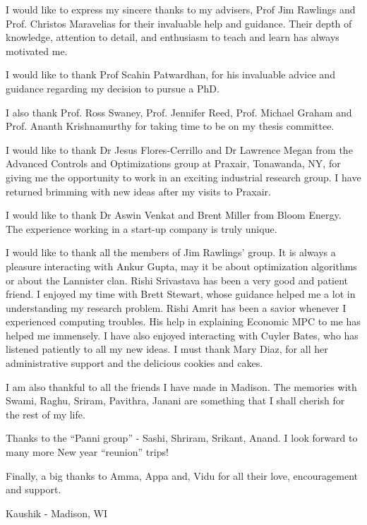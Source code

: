 \begin{acknowledgments}
I would like to express my sincere thanks to my advisers, Prof Jim
Rawlings and Prof. Christos Maravelias for their invaluable help and
guidance. Their depth of knowledge, attention to detail, and
enthusiasm to teach and learn has always motivated me. 

I would like to thank Prof Scahin Patwardhan, for his invaluable
advice and guidance regarding my decision to pursue a PhD.
 
I also thank Prof. Ross Swaney, Prof. Jennifer Reed, Prof. Michael
Graham and Prof. Ananth Krishnamurthy for taking time to be on my
thesis committee.
  
I would like to thank Dr Jesus Flores-Cerrillo and Dr Lawrence Megan
from the Advanced Controls and Optimizations group at Praxair,
Tonawanda, NY, for giving me the opportunity to work in an exciting
industrial research group. I have returned brimming with new ideas
after my visits to Praxair. 

I would like to thank Dr Aswin Venkat and Brent Miller from Bloom
Energy. The experience working in a start-up company is truly unique.

I would like to thank all the members of Jim Rawlings' group. 
It is always a pleasure interacting with Ankur
Gupta, may it be about optimization algorithms or about the Lannister
clan. Rishi Srivastava has been a very good and patient friend. I
enjoyed my time with  Brett Stewart, whose guidance helped me a lot in 
understanding  my research problem. Rishi Amrit has been a savior
whenever I experienced computing troubles. His help in explaining
Economic MPC to me has helped me immensely. I have also enjoyed
interacting with Cuyler Bates, who has listened patiently to all my new
ideas. I must thank Mary Diaz, for all her administrative support and the delicious
cookies and cakes.

I am also thankful to all the friends I have made in Madison. The
memories with Swami, Raghu, Sriram, Pavithra, Janani are something
that I shall cherish for the rest of my life. 

Thanks to the ``Panni group'' - Sashi, Shriram, Srikant, Anand. I look
forward to many more New year ``reunion'' trips!

Finally,  a big thanks to Amma, Appa and, Vidu for all their love,
encouragement and support.
  
  \raggedleft
  Kaushik - Madison, WI

\end{acknowledgments}

\tableofcontents
\listoftables
\listoffigures

%





\begin{abstract}
  
\end{abstract}


\clearpage{} %
